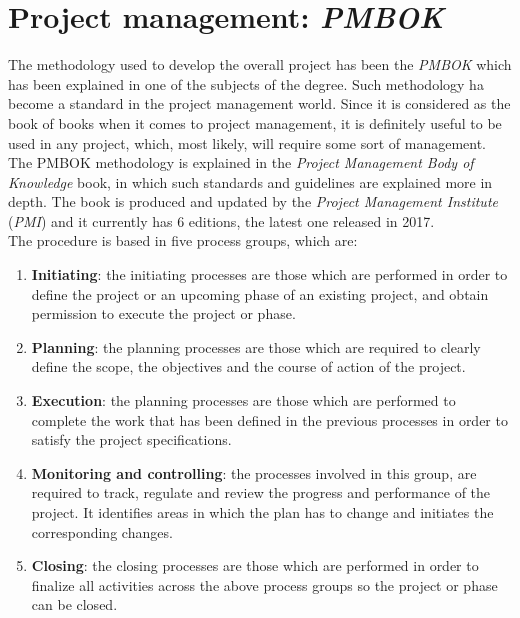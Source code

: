 \documentclass[a4paper, 12pt, oneside]{book}
\begin{document}
\section{Project management: \emph{PMBOK}}
The methodology used to develop the overall project has been the \emph{PMBOK} which has been explained in one of the subjects of the degree. Such methodology ha become a standard in the project management world. Since it is considered as the book of books when it comes to project management, it is definitely useful to be used in any project, which, most likely, will require some sort of management.
\\[8pt]
The PMBOK methodology is explained in the \emph{Project Management Body of Knowledge} book, in which such standards and guidelines are explained more in depth. The book is produced and updated by the \emph{Project Management Institute} (\emph{PMI}) and it currently has 6 editions, the latest one released in 2017.
\\[8pt]
The procedure is based in five process groups, which are:
\begin{enumerate}[label = \arabic{*}.]
	\item \textbf{Initiating}: the initiating processes are those which are performed in order to define the project or an upcoming phase of an existing project, and obtain permission to execute the project or phase.
	\item \textbf{Planning}: the planning processes are those which are required to clearly define the scope, the objectives and the course of action of the project.
	\item \textbf{Execution}: the planning processes are those which are performed to complete the work that has been defined in the previous processes in order to satisfy the project specifications.
	\item \textbf{Monitoring and controlling}: the processes involved in this group, are required to track, regulate and review the progress and performance of the project. It identifies areas in which the plan has to change and initiates the corresponding changes.
	\item \textbf{Closing}: the closing processes are those which are performed in order to finalize all activities across the above process groups so the project or phase can be closed.
\end{enumerate}
\end{document}
